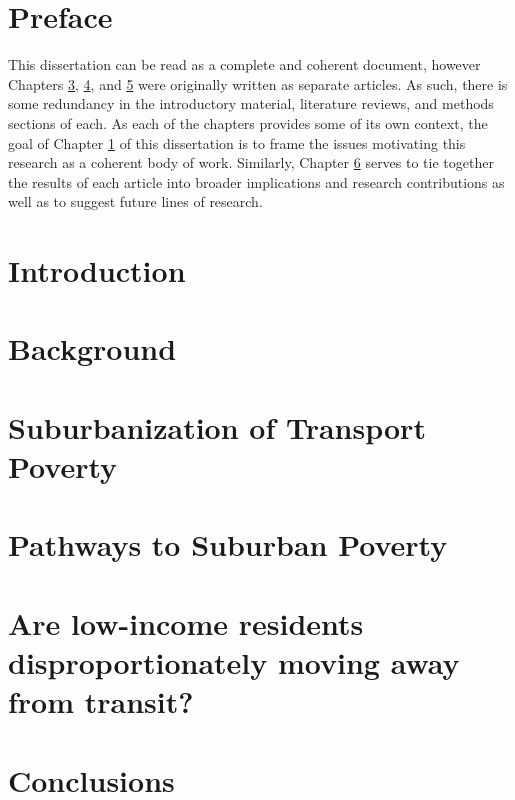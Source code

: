 \documentclass[11 pt, letterpaper]{report}
\begin{document}
\newpage


\chapter*{Preface}


This dissertation can be read as a complete and coherent document, however Chapters \ref{ch:subtrapov}, \ref{ch:pathsubpov}, and \ref{ch:lowinctra} were originally written as separate articles. As such, there is some redundancy in the introductory material, literature reviews, and methods sections of each. As each of the chapters provides some of its own context, the goal of Chapter \ref{ch:intro} of this dissertation is to frame the issues motivating this research as a coherent body of work. Similarly, Chapter \ref{ch:conc} serves to tie together the results of each article into broader implications and research contributions as well as to suggest future lines of research. 



\newpage


\renewcommand{\thepage}{\arabic{page}}%
\setcounter{page}{1}



\chapter{{Introduction}}


\label{ch:intro}



\chapter{Background}
\label{ch:background}




\chapter{Suburbanization of Transport Poverty}
\label{ch:subtrapov}




\chapter{Pathways to Suburban Poverty}
\label{ch:pathsubpov}




\chapter{Are low-income residents disproportionately moving away from transit?}
\label{ch:lowinctra}





\chapter{Conclusions}
\label{ch:conc}








\end{document}
